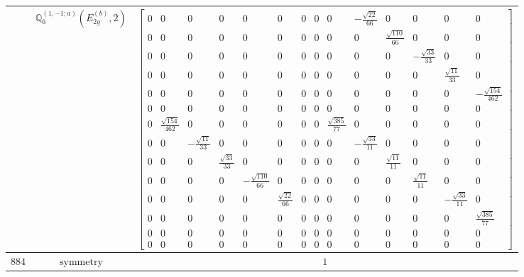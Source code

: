 \documentclass[fleqn,8pt,landscape]{jsarticle}
\begin{document}
\begin{longtable}{ccc}
$  $ & $ \mathbb{Q}_{6}^{(1,-1;a)}(E_{2g}^{(b)},2) $ & $ \begin{bmatrix} 0 & 0 & 0 & 0 & 0 & 0 & 0 & 0 & 0 & - \frac{\sqrt{22}}{66} & 0 & 0 & 0 & 0 \\ 0 & 0 & 0 & 0 & 0 & 0 & 0 & 0 & 0 & 0 & \frac{\sqrt{110}}{66} & 0 & 0 & 0 \\ 0 & 0 & 0 & 0 & 0 & 0 & 0 & 0 & 0 & 0 & 0 & - \frac{\sqrt{33}}{33} & 0 & 0 \\ 0 & 0 & 0 & 0 & 0 & 0 & 0 & 0 & 0 & 0 & 0 & 0 & \frac{\sqrt{11}}{33} & 0 \\ 0 & 0 & 0 & 0 & 0 & 0 & 0 & 0 & 0 & 0 & 0 & 0 & 0 & - \frac{\sqrt{154}}{462} \\ 0 & 0 & 0 & 0 & 0 & 0 & 0 & 0 & 0 & 0 & 0 & 0 & 0 & 0 \\ 0 & \frac{\sqrt{154}}{462} & 0 & 0 & 0 & 0 & 0 & 0 & \frac{\sqrt{385}}{77} & 0 & 0 & 0 & 0 & 0 \\ 0 & 0 & - \frac{\sqrt{11}}{33} & 0 & 0 & 0 & 0 & 0 & 0 & - \frac{\sqrt{33}}{11} & 0 & 0 & 0 & 0 \\ 0 & 0 & 0 & \frac{\sqrt{33}}{33} & 0 & 0 & 0 & 0 & 0 & 0 & \frac{\sqrt{11}}{11} & 0 & 0 & 0 \\ 0 & 0 & 0 & 0 & - \frac{\sqrt{110}}{66} & 0 & 0 & 0 & 0 & 0 & 0 & \frac{\sqrt{11}}{11} & 0 & 0 \\ 0 & 0 & 0 & 0 & 0 & \frac{\sqrt{22}}{66} & 0 & 0 & 0 & 0 & 0 & 0 & - \frac{\sqrt{33}}{11} & 0 \\ 0 & 0 & 0 & 0 & 0 & 0 & 0 & 0 & 0 & 0 & 0 & 0 & 0 & \frac{\sqrt{385}}{77} \\ 0 & 0 & 0 & 0 & 0 & 0 & 0 & 0 & 0 & 0 & 0 & 0 & 0 & 0 \\ 0 & 0 & 0 & 0 & 0 & 0 & 0 & 0 & 0 & 0 & 0 & 0 & 0 & 0 \end{bmatrix} $ \\ \hline
$ 884 $ & $ \text{symmetry} $ & $ 1 $ \\

\end{longtable}
\end{document}
